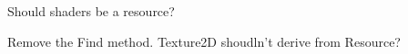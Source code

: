 \begin{DoxyRefList}
\item[\label{todo__todo000009}%
\hypertarget{todo__todo000009}{}%
File \hyperlink{Shader_8cpp}{Shader.cpp} ]Should shaders be a resource?  
\item[\label{todo__todo000011}%
\hypertarget{todo__todo000011}{}%
File \hyperlink{Texture2D_8h}{Texture2\-D.h} ]Remove the Find method. Texture2\-D shoudln't derive from Resource?
\end{DoxyRefList}